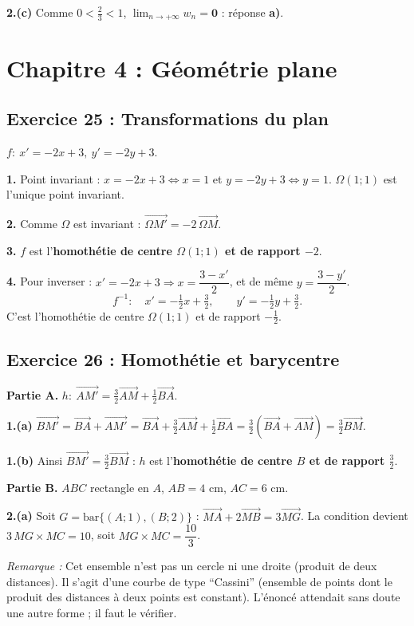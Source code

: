 \documentclass[11pt,a4paper]{article}
\newcommand{\vect}[1]{\overrightarrow{#1}}
\newenvironment{rem}{\par\medskip\noindent\textit{Remarque :}\quad}{\par\medskip}
\begin{document}
\textbf{2.(c)} Comme $0<\frac23<1$, $\lim_{n\to+\infty}w_n=\mathbf{0}$ : r\'eponse \textbf{a)}.

\section{Chapitre 4 : G\'eom\'etrie plane}

\subsection{Exercice 25 : Transformations du plan}

$f:\ x'=-2x+3,\ y'=-2y+3$.

\textbf{1.} Point invariant : $x=-2x+3\iff x=1$ et $y=-2y+3\iff y=1$. \textbf{$\Omega(1;1)$} est l'unique point invariant.

\textbf{2.} Comme $\Omega$ est invariant : $\vect{\Omega M'}=-2\,\vect{\Omega M}$.

\textbf{3.} $f$ est l'\textbf{homoth\'etie de centre $\Omega(1;1)$ et de rapport $-2$}.

\textbf{4.} Pour inverser : $x'=-2x+3\Rightarrow x=\dfrac{3-x'}{2}$, et de m\^eme $y=\dfrac{3-y'}{2}$.
\[
f^{-1}:\quad x'=-\tfrac12x+\tfrac32,\qquad y'=-\tfrac12y+\tfrac32.
\]
C'est l'homoth\'etie de centre $\Omega(1;1)$ et de rapport $-\frac12$.

\subsection{Exercice 26 : Homoth\'etie et barycentre}

\textbf{Partie A.} $h:\ \vect{AM'}=\tfrac32\vect{AM}+\tfrac12\vect{BA}$.

\textbf{1.(a)} $\vect{BM'}=\vect{BA}+\vect{AM'}=\vect{BA}+\tfrac32\vect{AM}+\tfrac12\vect{BA}
=\tfrac32\left(\vect{BA}+\vect{AM}\right)=\tfrac32\vect{BM}$.

\textbf{1.(b)} Ainsi $\vect{BM'}=\tfrac32\vect{BM}$ : $h$ est l'\textbf{homoth\'etie de centre $B$ et de rapport $\frac32$}.

\textbf{Partie B.} $ABC$ rectangle en $A$, $AB=4$ cm, $AC=6$ cm.

\textbf{2.(a)} Soit $G=\mathrm{bar}\{(A;1),(B;2)\}$ : $\vect{MA}+2\vect{MB}=3\vect{MG}$. La condition devient
$3\,MG\times MC=10$, soit $MG\times MC=\dfrac{10}{3}$.
\begin{rem} Cet ensemble n'est pas un cercle ni une droite (produit de deux distances). Il s'agit d'une courbe
de type ``Cassini'' (ensemble de points dont le produit des distances \`a deux points est constant).
L'\'enonc\'e attendait sans doute une autre forme ; il faut le v\'erifier.\end{rem}
\end{document}
